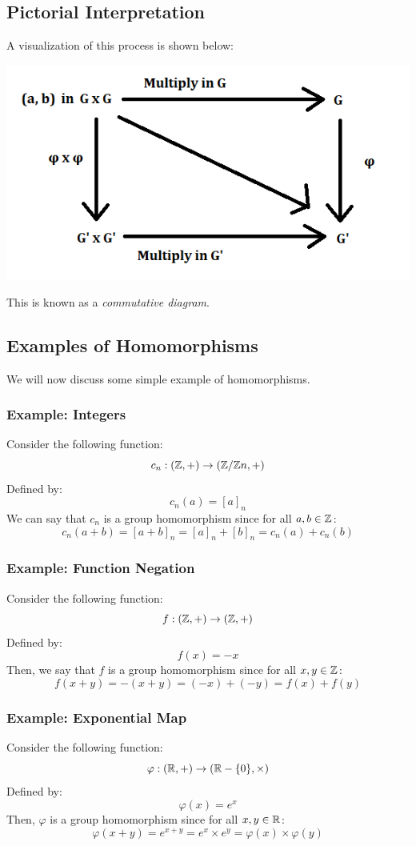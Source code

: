 \documentclass[letterpaper]{article}
\begin{document}
\subsection{Pictorial Interpretation}
A visualization of this process is shown below: 
\begin{center}
    \includegraphics[scale=0.7]{assets/homo_diagram.png}
\end{center}
This is known as a \emph{commutative diagram}.

\subsection{Examples of Homomorphisms}
We will now discuss some simple example of homomorphisms. 

\subsubsection{Example: Integers}
Consider the following function: 
\[c_n: (\mathbb{Z}, +) \to (\mathbb{Z} / \mathbb{Z} n, +)\]
Defined by: 
\[c_{n}(a) = [a]_n\]
We can say that $c_n$ is a group homomorphism since for all $a, b \in \mathbb{Z}$: 
\[c_{n}(a + b) = [a + b]_n = [a]_n + [b]_n = c_{n}(a) + c_{n}(b)\]

\subsubsection{Example: Function Negation}
Consider the following function: 
\[f: (\mathbb{Z}, +) \to (\mathbb{Z}, +)\]
Defined by: 
\[f(x) = -x\]
Then, we say that $f$ is a group homomorphism since for all $x, y \in \mathbb{Z}$: 
\[f(x + y) = -(x + y) = (-x) + (-y) = f(x) + f(y)\]

\subsubsection{Example: Exponential Map}
Consider the following function: 
\[\varphi: (\mathbb{R}, +) \to (\mathbb{R} - \{0\}, \times)\]
Defined by: 
\[\varphi(x) = e^x\]
Then, $\varphi$ is a group homomorphism since for all $x, y \in \mathbb{R}$: 
\[\varphi(x + y) = e^{x + y} = e^x \times e^y = \varphi(x) \times \varphi(y)\]
\end{document}
